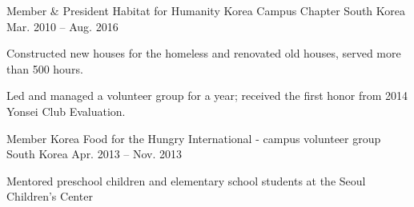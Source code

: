 


\begin{cventries}


\cventry
{Member \& President} %
{Habitat for Humanity Korea Campus Chapter} %
{South Korea} %
{Mar. 2010 – Aug. 2016} %
{ %
\begin{cvitems}
\item {Constructed new houses for the homeless and renovated old houses, served more than 500 hours.}
\item {Led and managed a volunteer group for a year; received the first honor from 2014 Yonsei Club Evaluation.}
\end{cvitems}
}


\cventry
{Member} %
{Korea Food for the Hungry International - campus volunteer group} %
{South Korea} %
{Apr. 2013 – Nov. 2013} %
{ %
\begin{cvitems}
\item {Mentored preschool children and elementary school students at the Seoul Children’s Center}
\end{cvitems}
}


\end{cventries}